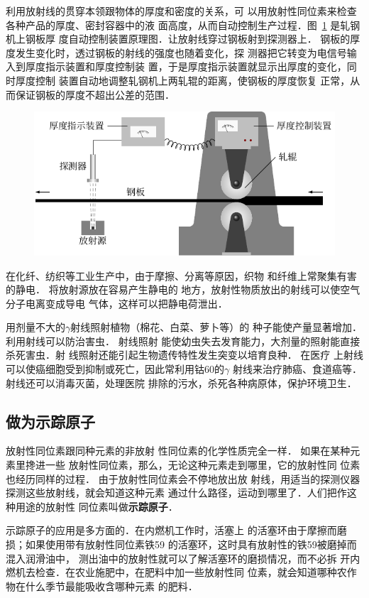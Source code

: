 利用放射线的贯穿本领跟物体的厚度和密度的关系，可
以用放射性同位素来检查各种产品的厚度、密封容器中的液
面高度，从而自动控制生产过程．图~\ref{fig_C_9-10} 是轧钢机上钢板厚
度自动控制装置原理图．让放射线穿过钢板射到探测器上．
钢板的厚度发生变化时，透过钢板的射线的强度也随着变化，探
测器把它转变为电信号输入到厚度指示装置和厚度控制装
置，于是厚度指示装置就显示出厚度的变化，同时厚度控制
装置自动地调整轧钢机上两轧辊的距离，使钢板的厚度恢复
正常，从而保证钢板的厚度不超出公差的范围．
\begin{figure}[htbp]
    \centering
    \includegraphics{fig/C/9-10.pdf}
    \caption{}\label{fig_C_9-10}
\end{figure}

在化纤、纺织等工业生产中，由于摩擦、分离等原因，织物
和纤维上常聚集有害的静电．
将放射源放在容易产生静电的
地方，放射性物质放出的射线可以使空气分子电离变成导电
气体，这样可以把静电荷泄出．

用剂量不大的$\gamma$射线照射植物（棉花、白菜、萝卜等）的
种子能使产量显著增加．利用射线可以防治害虫．
射线照射
能使幼虫失去发育能力，大剂量的照射能直接杀死害虫．射
线照射还能引起生物遗传特性发生突变以培育良种．
在医疗
上射线可以使癌细胞受到抑制或死亡，因此常利用钴60的$\gamma$
射线来治疗肺癌、食道癌等．射线还可以消毒灭菌，处理医院
排除的污水，杀死各种病原体，保护环境卫生．

\subsection{做为示踪原子}

放射性同位素跟同种元素的非放射
性同位素的化学性质完全一样．
如果在某种元素里搀进一些
放射性同位素，那么，无论这种元素走到哪里，它的放射性同
位素也经历同样的过程．
由于放射性同位素会不停地放出放
射线，用适当的探测仪器探测这些放射线，就会知道这种元素
通过什么路径，运动到哪里了．人们把作这种用途的放射性
同位素叫做\textbf{示踪原子}．

示踪原子的应用是多方面的．在内燃机工作时，活塞上
的活塞环由于摩擦而磨损；如果使用带有放射性同位素铁59
的活塞环，这时具有放射性的铁59被磨掉而混入润滑油中，
测出油中的放射性就可以了解活塞环的磨损情况，而不必拆
开内燃机去检查．在农业施肥中，在肥料中加一些放射性同
位素，就会知道哪种农作物在什么季节最能吸收含哪种元素
的肥料．

